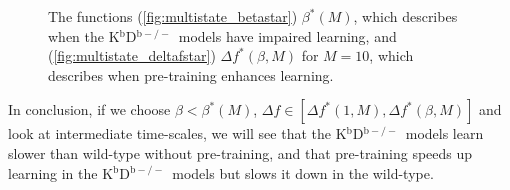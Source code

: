\documentclass[10pt]{article}
\newcommand{\KO}{K$^\mathrm{b}$D$^{\mathrm{b}-/-}$}
\begin{document}

\begin{figure}
 \begin{center}
 \begin{myenuma}
  \item{}\label{fig:multistate_betastar}
  \item{}\label{fig:multistate_deltafstar}
 \end{myenuma}
 \end{center}
  \caption[The functions $\beta^*(M)$ and $\Delta f^*(\beta,M)$]{The functions (\ref{fig:multistate_betastar}) $\beta^*(M)$, which describes when the \KO\ models have impaired learning, and (\ref{fig:multistate_deltafstar}) $\Delta f^*(\beta,M)$ for $M=10$, which describes when pre-training enhances learning.}\label{fig:multistate_star}
\end{figure}

In conclusion, if we choose $\beta<\beta^*(M)$, $\Delta f \in [\Delta f^*(1,M),\Delta f^*(\beta,M)]$ and look at intermediate time-scales, we will see that the \KO\ models learn slower than wild-type without pre-training, and that pre-training speeds up learning in the \KO\ models but slows it down in the wild-type.
\end{document}
